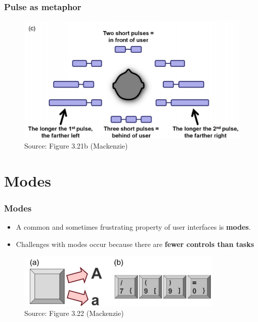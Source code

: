 \documentclass{beamer}
\begin{document}
\begin{frame}
	\frametitle{Pulse as metaphor}
	\begin{figure}
		\includegraphics[width=0.9\linewidth]{image/3-21b}
		\caption{Source: Figure 3.21b (Mackenzie)}
	\end{figure}
\end{frame}

\section{Modes}

\begin{frame}
	\frametitle{Modes}
	\begin{itemize}
		\item A common and sometimes frustrating property of user interfaces is \textbf{modes}.
		\item Challenges with modes occur because there are \textbf{fewer 
		controls than tasks} %
	\end{itemize}
	\begin{figure}
		\includegraphics[width=0.9\linewidth]{image/3-22}
		\caption{Source: Figure 3.22 (Mackenzie)}
	\end{figure}
\end{frame}
\end{document}
